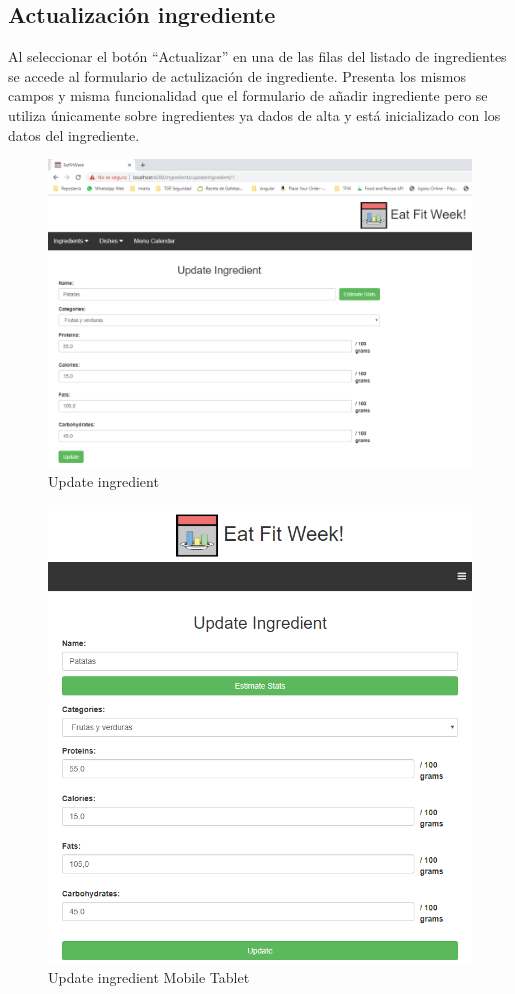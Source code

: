 \documentclass[12pt, a4paper, twoside]{book}
\begin{document}
	\subsection{Actualización ingrediente}
	Al seleccionar el botón ``Actualizar'' en una de las filas del listado de ingredientes se accede al formulario de actulización de ingrediente. Presenta los mismos campos y misma funcionalidad que el formulario de añadir ingrediente pero se utiliza únicamente sobre ingredientes ya dados de alta y está inicializado con los datos del ingrediente.	
	\begin{figure}[H]
		\centering
		\includegraphics[width=15cm]{Imagenes/MU-UpdateIngredient.png}
		\caption{Update ingredient}\label{Update ingredient}
	\end{figure}
	\begin{figure}[H]
		\centering
		\includegraphics[width=15cm]{Imagenes/MU-UpdateIngredientMobileTablet.png}
		\caption{Update ingredient Mobile Tablet}\label{Update ingredient Mobile And Tablet}
	\end{figure}
\end{document}
